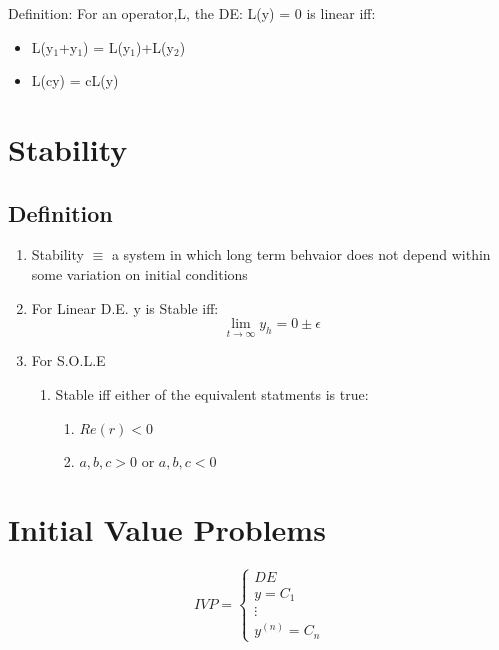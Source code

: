 \documentclass[11pt]{article}
\begin{document}
  Definition: For an operator,L, the DE: L(y) = 0 is linear iff:
\begin{itemize}
\item L(y$_1$+y$_1$) = L(y$_1$)+L(y$_2$)
\item L(cy) = cL(y)
\end{itemize}
\section{Stability}
\label{sec-4}

\subsection{Definition}
\label{sec-4.1}

\begin{enumerate}
\item Stability $\equiv$ a system in which long term behvaior does not
      depend within some variation on initial conditions
\item For Linear D.E. y is Stable iff:
    \begin{equation}
    \lim_{t\rightarrow \infty} y_h = 0 \pm \epsilon
    \end{equation}
\item For S.O.L.E

\begin{enumerate}
\item Stable iff either of the equivalent statments is true:

\begin{enumerate}
\item $Re(r) < 0$
\item $a,b,c >0$ or $a,b,c <0$
\end{enumerate}

\end{enumerate}

\end{enumerate}
\section{Initial Value Problems}
\label{sec-5}

  \begin{equation}
  IVP = \left \{
  \begin{array}{lr}
  DE\\
  y = C_1\\
  \vdots\\
  y^{(n)} = C_n
  \end{array}
  \right.
  \end{equation}
 
\end{document}
